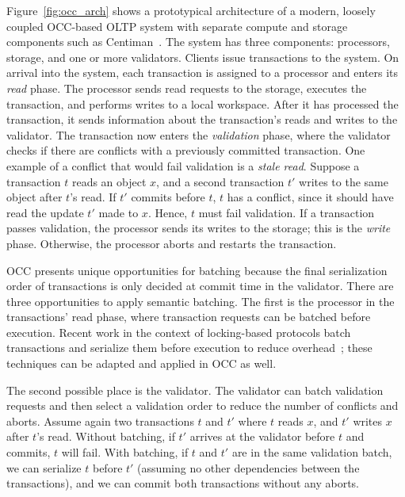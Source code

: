 Figure~\ref{fig:occ_arch} shows a prototypical architecture of a modern, loosely coupled OCC-based OLTP system with separate compute and storage components such as Centiman~\cite{ding2015centiman}. 
The system has three components: processors, storage, and one or more validators. Clients issue transactions to the system. On arrival into the system, each transaction is assigned to a processor and enters its \emph{read} phase. The processor sends read requests to the storage, executes the transaction, and performs writes to a local workspace. After it has processed the transaction, it sends information about the transaction's reads and writes to the validator. 
The transaction now enters the \emph{validation} phase, where 
the validator checks if there are conflicts with a previously committed transaction. 
One example of a conflict that would fail validation is a \emph{stale read}. Suppose a transaction $t$ reads an object $x$, and a second transaction
$t'$ writes to the same object after $t$'s read. If $t'$ commits before $t$, $t$
has a conflict, since it should have read the update $t'$ made to $x$. Hence, $t$ must fail validation. 
If a transaction passes validation, the processor sends its writes to the storage; this is the \emph{write} phase. Otherwise, the processor aborts and restarts the transaction.

OCC 
presents unique opportunities for batching because the final serialization order of transactions is only decided at commit time in the validator. 
There are three opportunities to apply semantic batching. The first is the processor in
the transactions' read phase, where transaction requests can be batched before
execution. Recent work in the context of locking-based protocols batch transactions 
and serialize them before execution to reduce overhead~\cite{faleiro2014rethinking,mu2014extracting,thomson2012calvin}; 
these techniques can be adapted and applied in OCC as well.

The second possible place is the validator. The validator can batch validation requests and then select 
a validation order to reduce the number of conflicts and
aborts. Assume again two transactions $t$ and $t'$ where $t$ reads $x$,
and $t'$ writes $x$ after $t$'s read. Without batching, if $t'$ arrives at
the validator before $t$ and commits, $t$ will fail. With
batching, if $t$ and $t'$ are in the same validation batch, 
we can serialize $t$ before $t'$ (assuming no other dependencies between the transactions), 
and we can commit both transactions without any aborts.

